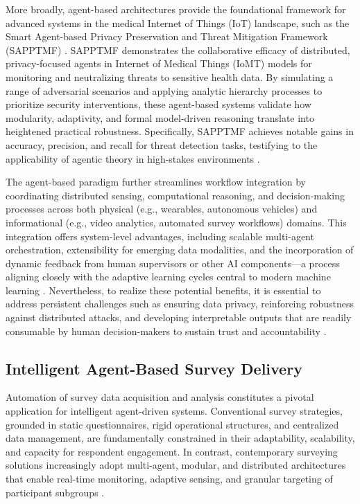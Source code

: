 More broadly, agent-based architectures provide the foundational framework for advanced systems in the medical Internet of Things (IoT) landscape, such as the Smart Agent-based Privacy Preservation and Threat Mitigation Framework (SAPPTMF) \cite{ref19}. SAPPTMF demonstrates the collaborative efficacy of distributed, privacy-focused agents in Internet of Medical Things (IoMT) models for monitoring and neutralizing threats to sensitive health data. By simulating a range of adversarial scenarios and applying analytic hierarchy processes to prioritize security interventions, these agent-based systems validate how modularity, adaptivity, and formal model-driven reasoning translate into heightened practical robustness. Specifically, SAPPTMF achieves notable gains in accuracy, precision, and recall for threat detection tasks, testifying to the applicability of agentic theory in high-stakes environments \cite{ref19}.

The agent-based paradigm further streamlines workflow integration by coordinating distributed sensing, computational reasoning, and decision-making processes across both physical (e.g., wearables, autonomous vehicles) and informational (e.g., video analytics, automated survey workflows) domains. This integration offers system-level advantages, including scalable multi-agent orchestration, extensibility for emerging data modalities, and the incorporation of dynamic feedback from human supervisors or other AI components—a process aligning closely with the adaptive learning cycles central to modern machine learning \cite{ref78,ref80,ref104}. Nevertheless, to realize these potential benefits, it is essential to address persistent challenges such as ensuring data privacy, reinforcing robustness against distributed attacks, and developing interpretable outputs that are readily consumable by human decision-makers to sustain trust and accountability \cite{ref91,ref94,ref98,ref104}.

\subsection{Intelligent Agent-Based Survey Delivery}

Automation of survey data acquisition and analysis constitutes a pivotal application for intelligent agent-driven systems. Conventional survey strategies, grounded in static questionnaires, rigid operational structures, and centralized data management, are fundamentally constrained in their adaptability, scalability, and capacity for respondent engagement. In contrast, contemporary surveying solutions increasingly adopt multi-agent, modular, and distributed architectures that enable real-time monitoring, adaptive sensing, and granular targeting of participant subgroups \cite{ref112}\cite{ref113}\cite{ref117}.

